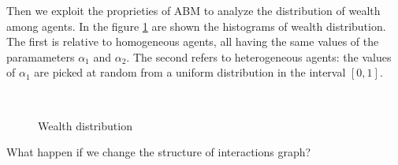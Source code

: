 \documentclass[10pt,a4paper]{article}
\begin{document}
Then we exploit the proprieties of ABM to analyze the distribution of wealth among agents. In the figure \ref{WealthDistribution} are shown the histograms of wealth distribution. The first is relative to homogeneous agents, all having the same values of the paramameters $\alpha_1$ and $\alpha_2$. The second refers to heterogeneous agents: the values of $\alpha_1$ 
are picked at random from a uniform distribution in the interval $[0,1]$.
\begin{figure}[h]
\centering
{}\\
\caption{Wealth distribution}
\label{WealthDistribution}
\end{figure}


What happen if we change the structure of interactions graph?
\end{document}
